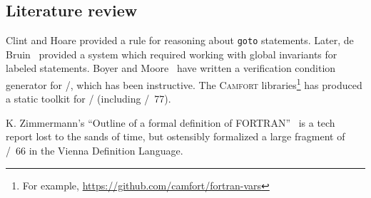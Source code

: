 \subsection{Literature review}
Clint and Hoare provided a rule for reasoning about \texttt{goto}
statements. Later, de Bruin~\cite{deBruin1981goto} provided a system
which required working with global invariants for labeled statements.
Boyer and Moore~\cite{boyer1980vcg} have written a verification
condition generator for \FORTRAN/, which has been instructive.
The \textsc{Camfort} libraries\footnote{For example, \url{https://github.com/camfort/fortran-vars}} has produced a static toolkit for \FORTRAN/
(including \FORTRAN/~77).

K. Zimmermann's ``Outline of a formal deﬁnition of FORTRAN''~\cite{zimmerman1969outline} is a
tech report lost to the sands of time, but ostensibly formalized a large
fragment of \FORTRAN/~66 in the Vienna Definition Language.




